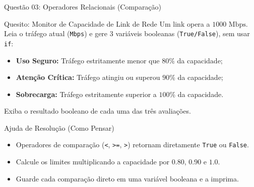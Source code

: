 \begin{frame}{Questão 03: Operadores Relacionais (Comparação)}
    \begin{block}{Quesito: Monitor de Capacidade de Link de Rede}
        Um link opera a $1000\text{ Mbps}$. Leia o tráfego atual (\texttt{Mbps}) e gere 3 variáveis booleanas (\texttt{True/False}), sem usar \texttt{if}:
        \begin{itemize}
            \item \textbf{Uso Seguro:} Tráfego estritamente menor que $80\%$ da capacidade;
            \item \textbf{Atenção Crítica:} Tráfego atingiu ou superou $90\%$ da capacidade;
            \item \textbf{Sobrecarga:} Tráfego estritamente superior a $100\%$ da capacidade.
        \end{itemize}
        Exiba o resultado booleano de cada uma das três avaliações.
    \end{block}

    \begin{exampleblock}{Ajuda de Resolução (Como Pensar)}
        \begin{itemize}
            \item Operadores de comparação (\texttt{<}, \texttt{>=}, \texttt{>}) retornam diretamente \texttt{True} ou \texttt{False}.
            \item Calcule os limites multiplicando a capacidade por $0.80$, $0.90$ e $1.0$.
            \item Guarde cada comparação direto em uma variável booleana e a imprima.
        \end{itemize}
    \end{exampleblock}
\end{frame}

